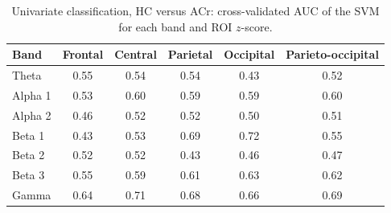 \documentclass[11pt]{article}
\begin{document}
\begin{table}[ht]
\centering
\caption{Univariate classification, HC versus ACr: cross-validated AUC of the SVM for each band and ROI $z$-score.}
\label{tab:uni_acr}
\small
\begin{tabular}{@{}lccccc@{}}
\toprule
Band & Frontal & Central & Parietal & Occipital & Parieto-occipital \\
\midrule
Theta & 0.55 & 0.54 & 0.54 & 0.43 & 0.52 \\
Alpha 1 & 0.53 & 0.60 & 0.59 & 0.59 & 0.60 \\
Alpha 2 & 0.46 & 0.52 & 0.52 & 0.50 & 0.51 \\
Beta 1 & 0.43 & 0.53 & 0.69 & 0.72 & 0.55 \\
Beta 2 & 0.52 & 0.52 & 0.43 & 0.46 & 0.47 \\
Beta 3 & 0.55 & 0.59 & 0.61 & 0.63 & 0.62 \\
Gamma & 0.64 & 0.71 & 0.68 & 0.66 & 0.69 \\
\bottomrule
\end{tabular}
\end{table}

\printbibliography
\end{document}
